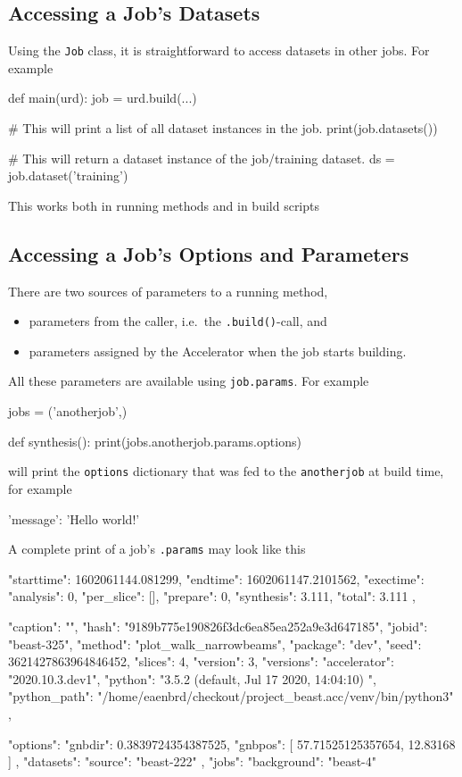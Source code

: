 \subsection{Accessing a Job's Datasets}
Using the \texttt{Job} class, it is straightforward to access datasets
in other jobs.  For example
\begin{python}
def main(urd):
    job = urd.build(...)

    # This will print a list of all dataset instances in the job.
    print(job.datasets())

    # This will return a dataset instance of the job/training dataset.
    ds = job.dataset('training')
\end{python}
This works both in running methods and in build scripts


\subsection{Accessing a Job's Options and Parameters}
\label{sec:params}
There are two sources of parameters to a running method,
\begin{itemize}
\item [] parameters from the caller, i.e.\ the \texttt{.build()}-call,
  and
\item [] parameters assigned by the Accelerator when the job starts
  building.
\end{itemize}
All these parameters are available using \texttt{job.params}.  For
example
\begin{python}
jobs = ('anotherjob',)

def synthesis():
    print(jobs.anotherjob.params.options)
\end{python}
will print the \texttt{options} dictionary that was fed to the
\texttt{anotherjob} at build time, for example
\begin{shelloutput}
{'message': 'Hello world!'}
\end{shelloutput}
\noindent A complete print of a job's \texttt{.params} may look like this
\begin{json}
{
    "starttime": 1602061144.081299,
    "endtime": 1602061147.2101562,
    "exectime": {
        "analysis": 0,
        "per_slice": [],
        "prepare": 0,
        "synthesis": 3.111,
        "total": 3.111
    },

    "caption": "",
    "hash": "9189b775e190826f3dc6ea85ea252a9e3d647185",
    "jobid": "beast-325",
    "method": "plot_walk_narrowbeams",
    "package": "dev",
    "seed": 3621427863964846452,
    "slices": 4,
    "version": 3,
    "versions": {
        "accelerator": "2020.10.3.dev1",
        "python": "3.5.2 (default, Jul 17 2020, 14:04:10) \n[GCC 5.4.0 20160609]",
        "python_path": "/home/eaenbrd/checkout/project_beast.acc/venv/bin/python3"
    },

    "options": {
        "gnbdir": 0.3839724354387525,
        "gnbpos": [
            57.71525125357654,
            12.83168
        ]
    },
    "datasets": {
        "source": "beast-222"
    },
    "jobs": {
        "background": "beast-4"
    }
}
\end{json}

